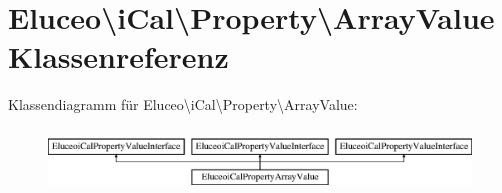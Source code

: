 \hypertarget{class_eluceo_1_1i_cal_1_1_property_1_1_array_value}{}\section{Eluceo\textbackslash{}i\+Cal\textbackslash{}Property\textbackslash{}Array\+Value Klassenreferenz}
\label{class_eluceo_1_1i_cal_1_1_property_1_1_array_value}
Klassendiagramm für Eluceo\textbackslash{}i\+Cal\textbackslash{}Property\textbackslash{}Array\+Value\+:\begin{figure}[H]
\begin{center}
\leavevmode
\includegraphics[height=1.659259cm]{class_eluceo_1_1i_cal_1_1_property_1_1_array_value}
\end{center}
\end{figure}
